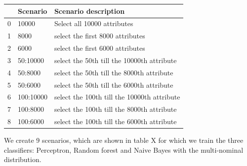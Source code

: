 \documentclass[11pt]{article}
\begin{document}
\begin{tabular}{lll}
\toprule
{} &   Scenario &  Scenario description \\
\midrule
0 &      10000 & Select all 10000 attributes   \\
1 &       8000 & select the first 8000 attributes  \\
2 &       6000 & select the first 6000 attributes   \\
3 &   50:10000 & select the 50th till the 10000th attribute   \\
4 &    50:8000 & select the 50th till the 8000th attribute    \\
5 &    50:6000 & select the 50th till the 6000th attribute    \\
6 &  100:10000 & select the 100th till the 10000th attribute    \\
7 &   100:8000 & select the 100th till the 8000th attribute    \\
8 &   100:6000 & select the 100th till the 6000th attribute	\\ 
\bottomrule
\end{tabular}

We create 9 scenarios, which are shown in table X for which we train the three classifiers: Perceptron, Random forest and Naive Bayes with the multi-nominal distribution.   
\end{document}
